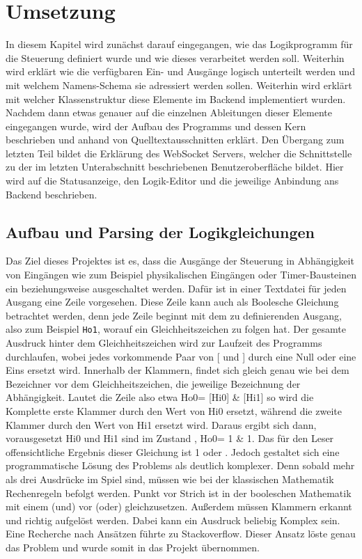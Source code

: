 \section{Umsetzung}\label{kap:ums}
In diesem Kapitel wird zunächst darauf eingegangen, wie das Logikprogramm für die Steuerung definiert wurde und wie dieses verarbeitet werden soll. Weiterhin wird erklärt wie die verfügbaren Ein- und Ausgänge logisch unterteilt werden und mit welchem Namens-Schema sie adressiert werden sollen.  Weiterhin wird erklärt mit welcher Klassenstruktur diese Elemente im Backend implementiert wurden. Nachdem dann etwas genauer auf die einzelnen Ableitungen dieser Elemente eingegangen wurde, wird der Aufbau  des Programms und dessen Kern beschrieben und anhand von Quelltextausschnitten erklärt. Den Übergang zum letzten Teil bildet die Erklärung des WebSocket Servers, welcher die Schnittstelle zu der im letzten Unterabschnitt beschriebenen Benutzeroberfläche bildet. Hier wird auf die Statusanzeige, den Logik-Editor und die jeweilige Anbindung ans Backend beschrieben.
%

\subsection{Aufbau und Parsing der Logikgleichungen}\label{kap:ums:parsing}
Das Ziel dieses Projektes ist es, dass die Ausgänge der Steuerung in Abhängigkeit von Eingängen wie zum Beispiel physikalischen Eingängen oder Timer-Bausteinen ein beziehungsweise ausgeschaltet werden. Dafür ist in einer Textdatei für jeden Ausgang eine Zeile vorgesehen. Diese Zeile kann auch als Boolesche Gleichung betrachtet werden, denn jede Zeile beginnt mit dem zu definierenden Ausgang, also zum Beispiel \texttt{Ho1}, worauf ein Gleichheitszeichen zu folgen hat. Der gesamte Ausdruck hinter dem Gleichheitszeichen wird zur Laufzeit des Programms durchlaufen, wobei jedes vorkommende Paar von [ und ] durch eine Null oder eine Eins ersetzt wird. Innerhalb der Klammern, findet sich gleich genau wie bei dem Bezeichner vor dem Gleichheitszeichen, die jeweilige Bezeichnung der Abhängigkeit. Lautet die Zeile also etwa Ho0= [Hi0] \& [Hi1] so wird die Komplette erste Klammer durch den Wert von Hi0 ersetzt, während die zweite Klammer  durch den Wert von Hi1 ersetzt wird. Daraus ergibt sich dann, vorausgesetzt Hi0 und Hi1 sind im Zustand , Ho0= 1 \& 1. Das für den Leser offensichtliche Ergebnis dieser Gleichung ist 1 oder . Jedoch gestaltet sich eine programmatische Lösung des Problems als deutlich komplexer. Denn sobald mehr als drei Ausdrücke im Spiel sind, müssen wie bei der klassischen Mathematik Rechenregeln befolgt werden. Punkt vor Strich ist in der booleschen Mathematik mit einem \wedge (und) vor \vee (oder) gleichzusetzen. Außerdem müssen Klammern erkannt und richtig aufgelöst werden. Dabei kann ein Ausdruck beliebig Komplex sein. Eine Recherche nach Ansätzen führte zu Stackoverflow.\cite{URL:Parsing} Dieser Ansatz löste genau das Problem und wurde somit in das Projekt übernommen. 

